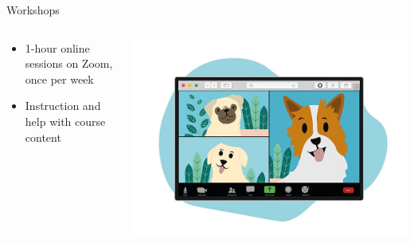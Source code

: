 \begin{frame}{Workshops}
  \begin{columns}[c,onlytextwidth]
    \begin{column}{0.5\linewidth}
      \begin{itemize}
        \item 1-hour online sessions on Zoom, once per week
        \item Instruction and help with course content
      \end{itemize}
    \end{column}
    \begin{column}{0.5\linewidth}
      \includegraphics[width=\textwidth]{figures/dogs.jpg}
    \end{column}
  \end{columns}
\end{frame}

